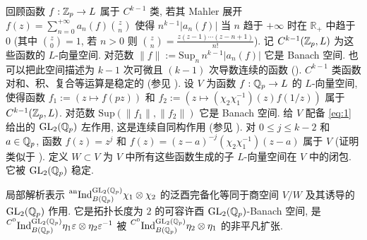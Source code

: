 回顾函数 $f : \mathbb{Z}_p \to L$ 属于 $C^{k-1}$ 类, 若其 Mahler 展开 $f(z) = \sum_{n=0}^{+\infty} a_n(f)\binom{z}{n}$ 使得 $n^{k-1}|a_n(f)|$ 当 $n$ 趋于 $+\infty$ 时在 $\mathbb{R}_{+}$ 中趋于 $0$ (其中 $\binom{z}{0} = 1$, 若 $n > 0$ 则 $\binom{z}{n} = \frac{z(z-1)\cdots(z-n+1)}{n!}$).
记 $C^{k-1}(\mathbb{Z}_p,L)$ 为这些函数的 $L$-向量空间.
对范数 $\|f\| := \mathrm{Sup}_n\, n^{k-1}|a_n(f)|$ 它是 Banach 空间.
也可以把此空间描述为 $k-1$ 次可微且 $(k-1)$ 次导数连续的函数 (\cite[\S54]{ref:42}).
$C^{k-1}$ 类函数对和、积、复合等运算是稳定的 (参见 \cite[Th.~77.5]{ref:42}).
设 $V$ 为函数 $f : \mathbb{Q}_p \to L$ 的 $L$-向量空间, 使得函数 $f_1 := (z \mapsto f(pz))$ 和 $f_2 := (z \mapsto (\chi_2\chi_1^{-1})(z)f(1/z))$ 属于 $C^{k-1}(\mathbb{Z}_p,L)$.
对范数 $\mathrm{Sup}(\|f_1\|,\|f_2\|)$ 它是 Banach 空间.
给 $V$ 配备 \eqref{eq:1} 给出的 $\mathrm{GL}_2(\mathbb{Q}_p)$ 左作用, 这是连续自同构作用 (参见 \cite[\S4.2]{ref:3}).
对 $0 \le j \le k-2$ 和 $a \in \mathbb{Q}_p$, 函数 $f(z) = z^{j}$ 和 $f(z) = (z-a)^{-j}(\chi_2\chi_1^{-1})(z-a)$ 属于 $V$ (证明类似于 \cite[Lem.~4.2.2]{ref:3}).
定义 $W \subset V$ 为 $V$ 中所有这些函数生成的子 $L$-向量空间在 $V$ 中的闭包.
它被 $\mathrm{GL}_2(\mathbb{Q}_p)$ 稳定.

\begin{theorem}\label{thm:2.2.2}
局部解析表示 $\prescript{\mathrm{an}}{}{\mathrm{Ind}}_{B(\mathbb{Q}_p)}^{\mathrm{GL}_2(\mathbb{Q}_p)} \chi_1 \otimes \chi_2$ 的泛酉完备化等同于商空间 $V/W$ 及其诱导的 $\mathrm{GL}_2(\mathbb{Q}_p)$ 作用.
它是拓扑长度为 $2$ 的可容许酉 $\mathrm{GL}_2(\mathbb{Q}_p)$-Banach 空间, 是 $\prescript{C^{0}}{}{\mathrm{Ind}}_{B(\mathbb{Q}_p)}^{\mathrm{GL}_2(\mathbb{Q}_p)} \eta_1\varepsilon \otimes \eta_2\varepsilon^{-1}$ 被 $\prescript{C^{0}}{}{\mathrm{Ind}}_{B(\mathbb{Q}_p)}^{\mathrm{GL}_2(\mathbb{Q}_p)} \eta_2 \otimes \eta_1$ 的非平凡扩张.
\end{theorem}


